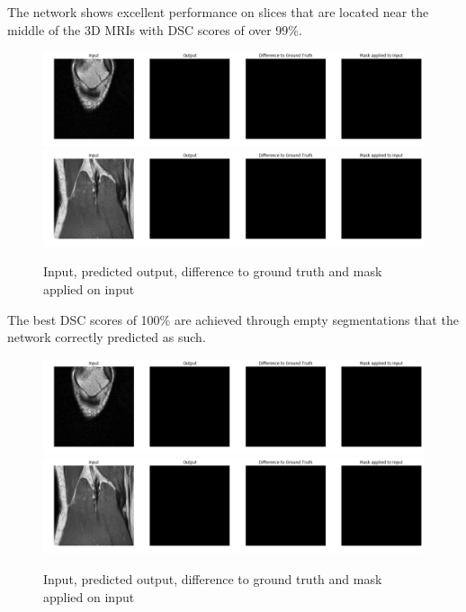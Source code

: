 The network shows excellent performance on slices that are located near the middle of the 3D MRIs with DSC scores of over 99\%.

\begin{figure}[H]
\centering
\par
\includegraphics[width=1.0\textwidth]{imgs/sample5.png}
\includegraphics[width=1.0\textwidth]{imgs/sample6.png}
\caption{Input, predicted output, difference to ground truth and mask applied on input}
\par
\end{figure}

The best DSC scores of 100\% are achieved through empty segmentations that the network correctly predicted as such.

\begin{figure}[H]
\centering
\par
\includegraphics[width=1.0\textwidth]{imgs/sample5.png}
\includegraphics[width=1.0\textwidth]{imgs/sample6.png}
\caption{Input, predicted output, difference to ground truth and mask applied on input}
\par
\end{figure}

